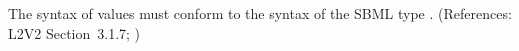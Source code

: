 The syntax of   values must conform to the syntax of the
SBML type .  (References: L2V2 Section~3.1.7;
)
